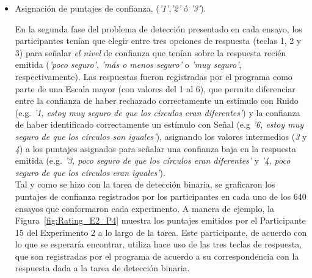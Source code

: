 \begin{itemize}

\item Asignación de puntajes de confianza, (\textit{'1'},\textit{'2'} ó \textit{'3'}).

En la segunda fase del problema de detección presentado en cada ensayo, los participantes tenían que elegir entre tres opciones de respuesta (teclas 1, 2 y 3) para señalar \textit{el nivel} de confianza que tenían sobre la respuesta recién emitida (\textit{'poco seguro'}, \textit{'más o menos seguro'} o \textit{'muy seguro'}, respectivamente). Las respuestas fueron registradas por el programa como parte de una Escala mayor (con valores del 1 al 6), que permite diferenciar entre la confianza de haber rechazado correctamente un estímulo con Ruido (e.g. \textit{'1, estoy muy seguro de que los círculos eran diferentes'}) y la confianza de haber identificado correctamente un estímulo con Señal (e.g \textit{'6, estoy muy seguro de que los círculos son iguales'}), asignando los valores intermedios (\textit{3} y \textit{4}) a los puntajes asignados para señalar una confianza baja en la respuesta emitida (e.g. \textit{'3, poco seguro de que los círculos eran diferentes'} y \textit{'4, poco seguro de que los círculos eran iguales'}).\\

Tal y como se hizo con la tarea de detección binaria, se graficaron los puntajes de confianza registrados por los participantes en cada uno de los 640 ensayos que conformaron cada experimento. A manera de ejemplo, la Figura~\ref{fig:Rating_E2_P4} muestra los puntajes emitidos por el Participante 15 del Experimento 2 a lo largo de la tarea. Este participante, de acuerdo con lo que se esperaría encontrar, utiliza hace uso de las tres teclas de respuesta, que son registradas por el programa de acuerdo a su correspondencia con la respuesta dada a la tarea de detección binaria.\\ 
 

\end{itemize}
